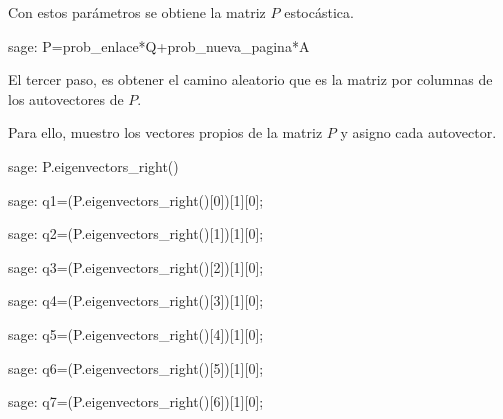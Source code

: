 \par Con estos parámetros se obtiene la matriz $P$ estocástica.
\begin{sagecommandline}
    sage: P=prob_enlace*Q+prob_nueva_pagina*A
\end{sagecommandline}
\par El tercer paso, es obtener el camino aleatorio que es la matriz por columnas de los autovectores de $P$.
\par Para ello, muestro los vectores propios de la matriz $P$ y asigno cada autovector.
\begin{sagecommandline}[\textwidth]
    sage: P.eigenvectors_right()
\end{sagecommandline}
   
\begin{sagecommandline}
    sage: q1=(P.eigenvectors_right()[0])[1][0];
\end{sagecommandline}

\begin{sagecommandline}
    sage: q2=(P.eigenvectors_right()[1])[1][0];
\end{sagecommandline}

\begin{sagecommandline}
    sage: q3=(P.eigenvectors_right()[2])[1][0];
\end{sagecommandline}

\begin{sagecommandline}
    sage: q4=(P.eigenvectors_right()[3])[1][0];
\end{sagecommandline}

\begin{sagecommandline}
    sage: q5=(P.eigenvectors_right()[4])[1][0];
\end{sagecommandline}

\begin{sagecommandline}
    sage: q6=(P.eigenvectors_right()[5])[1][0];
\end{sagecommandline}

\begin{sagecommandline}
    sage: q7=(P.eigenvectors_right()[6])[1][0];
\end{sagecommandline}


